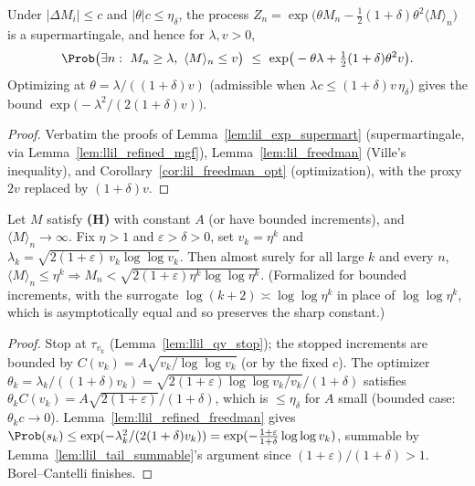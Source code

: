 \begin{lemma}\label{lem:llil_refined_freedman}
\leanok
{}
Under $|\Delta M_i|\le c$ and $|\theta|c\le\eta_\delta$, the process
$Z_n=\exp\!\big(\theta M_n-\tfrac12(1+\delta)\theta^2\langle M\rangle_n\big)$ is a
supermartingale, and hence for $\lambda,v>0$,
\[
  \Prob\big(\exists n:\ M_n\ge\lambda,\ \langle M\rangle_n\le v\big)\ \le\
  \exp\!\big(-\theta\lambda+\tfrac12(1+\delta)\theta^2 v\big).
\]
Optimizing at $\theta=\lambda/((1+\delta)v)$ (admissible when
$\lambda c\le(1+\delta)v\,\eta_\delta$) gives the bound
$\exp\!\big(-\lambda^2/(2(1+\delta)v)\big)$.
\end{lemma}
\begin{proof}
Verbatim the proofs of Lemma~\ref{lem:lil_exp_supermart} (supermartingale, via
Lemma~\ref{lem:llil_refined_mgf}), Lemma~\ref{lem:lil_freedman} (Ville's inequality),
and Corollary~\ref{cor:lil_freedman_opt} (optimization), with the proxy $2v$ replaced
by $(1+\delta)v$.
\end{proof}

\begin{lemma}[Sharp exceedance]\label{lem:llil_sharp_block}
\leanok
{}
Let $M$ satisfy \textbf{(H)} with constant $A$ (or have bounded increments), and
$\langle M\rangle_n\to\infty$. Fix $\eta>1$ and $\varepsilon>\delta>0$, set $v_k=\eta^k$
and $\lambda_k=\sqrt{2(1+\varepsilon)\,v_k\log\log v_k}$. Then almost surely for all
large $k$ and every $n$,
$\langle M\rangle_n\le\eta^k\Rightarrow M_n<\sqrt{2(1+\varepsilon)\eta^k\log\log\eta^k}$.
(Formalized for bounded increments, with the surrogate $\log(k+2)\asymp\log\log\eta^k$ in place of
$\log\log\eta^k$, which is asymptotically equal and so preserves the sharp constant.)
\end{lemma}
\begin{proof}
Stop at $\tau_{v_k}$ (Lemma~\ref{lem:llil_qv_stop}); the stopped increments are bounded
by $C(v_k)=A\sqrt{v_k/\log\log v_k}$ (or by the fixed $c$). The optimizer
$\theta_k=\lambda_k/((1+\delta)v_k)=\sqrt{2(1+\varepsilon)\log\log v_k/v_k}/(1+\delta)$
satisfies $\theta_k C(v_k)=A\sqrt{2(1+\varepsilon)}/(1+\delta)$, which is $\le\eta_\delta$
for $A$ small (bounded case: $\theta_k c\to0$). Lemma~\ref{lem:llil_refined_freedman}
gives $\Prob(s_k)\le\exp(-\lambda_k^2/(2(1+\delta)v_k))
=\exp(-\tfrac{1+\varepsilon}{1+\delta}\log\log v_k)$, summable by
Lemma~\ref{lem:llil_tail_summable}'s argument since $(1+\varepsilon)/(1+\delta)>1$.
Borel--Cantelli finishes.
\end{proof}

